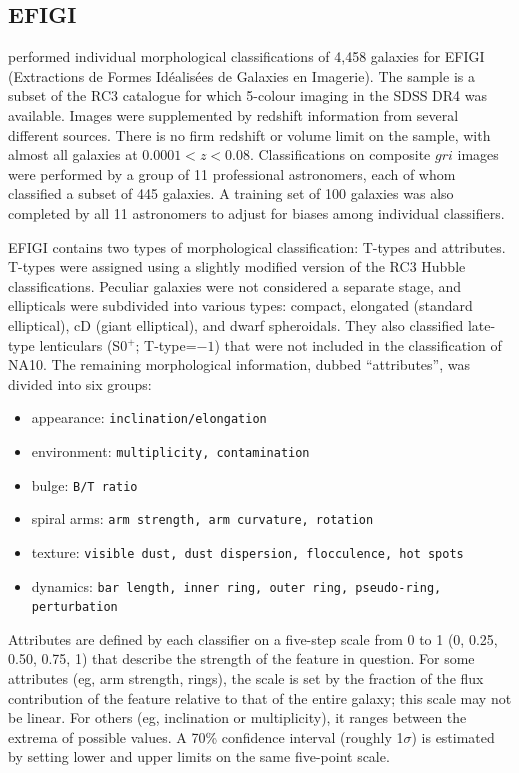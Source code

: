 \documentclass[useAMS,usenatbib]{mn2e}
\begin{document}
\subsection{EFIGI}

\citet{bai11} performed individual morphological classifications of 4,458 galaxies for EFIGI (Extractions de Formes Id\'ealis\'ees de Galaxies en Imagerie). The sample is a subset of the RC3 catalogue for which 5-colour imaging in the SDSS DR4 was available. Images were supplemented by redshift information from several different sources. There is no firm redshift or volume limit on the sample, with almost all galaxies at $0.0001<z<0.08$. Classifications on composite $gri$ images were performed by a group of 11 professional astronomers, each of whom classified a subset of 445 galaxies. A training set of 100 galaxies was also completed by all 11 astronomers to adjust for biases among individual classifiers. 

EFIGI contains two types of morphological classification: T-types and attributes. T-types were assigned using a slightly modified version of the RC3 Hubble classifications. Peculiar galaxies were not considered a separate stage, and ellipticals were subdivided into various types: compact, elongated (standard elliptical), cD (giant elliptical), and dwarf spheroidals. They also classified late-type lenticulars (S0$^+$; T-type=$-1$) that were not included in the classification of NA10. The remaining morphological information, dubbed ``attributes'', was divided into six groups:

\begin{itemize}
	\item appearance: {\tt inclination/elongation }
	\item environment: {\tt multiplicity, contamination}
	\item bulge: {\tt B/T ratio}
	\item spiral arms: {\tt arm strength, arm curvature, rotation}
	\item texture: {\tt visible dust, dust dispersion, flocculence, hot spots}
	\item dynamics: {\tt bar length, inner ring, outer ring, pseudo-ring, perturbation}
\end{itemize}

\noindent Attributes are defined by each classifier on a five-step scale from 0 to 1 (0, 0.25, 0.50, 0.75, 1) that describe the strength of the feature in question. For some attributes (eg, arm strength, rings), the scale is set by the fraction of the flux contribution of the feature relative to that of the entire galaxy; this scale may not be linear. For others (eg, inclination or multiplicity), it ranges between the extrema of possible values. A 70\% confidence interval (roughly 1$\sigma$) is estimated by setting lower and upper limits on the same five-point scale.
\end{document}
